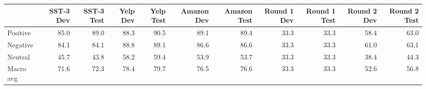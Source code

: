 \begin{tabular}{lrrrrrrrrrr}
\toprule
{} &  SST-3 Dev &  SST-3 Test &  Yelp Dev &  Yelp Test &  Amazon Dev &  Amazon Test &  Round 1 Dev &  Round 1 Test &  Round 2 Dev &  Round 2 Test \\
\midrule
Positive  &       85.0 &        89.0 &      88.3 &       90.5 &        89.1 &         89.4 &         33.3 &          33.3 &         58.4 &          63.0 \\
Negative  &       84.1 &        84.1 &      88.8 &       89.1 &        86.6 &         86.6 &         33.3 &          33.3 &         61.0 &          63.1 \\
Neutral   &       45.7 &        43.8 &      58.2 &       59.4 &        53.9 &         53.7 &         33.3 &          33.3 &         38.4 &          44.3 \\
Macro avg &       71.6 &        72.3 &      78.4 &       79.7 &        76.5 &         76.6 &         33.3 &          33.3 &         52.6 &          56.8 \\
\bottomrule
\end{tabular}
